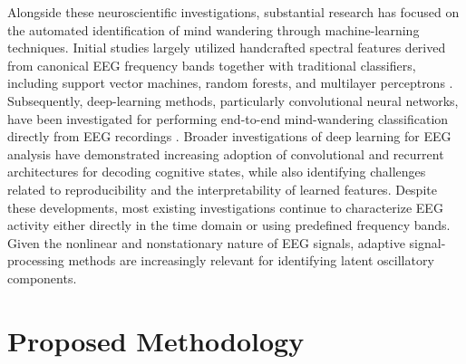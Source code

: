 \documentclass[conference]{IEEEtran}
\begin{document}
Alongside these neuroscientific investigations, substantial research has focused on the automated identification of mind wandering through machine-learning techniques. Initial studies largely utilized handcrafted spectral features derived from canonical EEG frequency bands together with traditional classifiers, including support vector machines, random forests, and multilayer perceptrons \cite{jin2020distinguishing,compton2019wandering}. Subsequently, deep-learning methods, particularly convolutional neural networks, have been investigated for performing end-to-end mind-wandering classification directly from EEG recordings \cite{hosseini2019deep}. Broader investigations of deep learning for EEG analysis have demonstrated increasing adoption of convolutional and recurrent architectures for decoding cognitive states, while also identifying challenges related to reproducibility and the interpretability of learned features.
Despite these developments, most existing investigations continue to characterize EEG activity either directly in the time domain or using predefined frequency bands. Given the nonlinear and nonstationary nature of EEG signals, adaptive signal-processing methods are increasingly relevant for identifying latent oscillatory components.
\section{Proposed Methodology}
\end{document}
